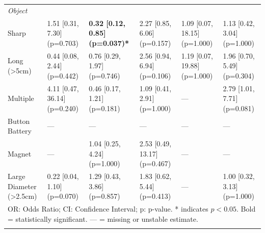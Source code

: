 \begin{table}
\begin{tabular}{p{3.5cm} p{4.1cm} p{4.1cm} p{4.1cm} p{4.1cm} p{4.1cm} }
\multicolumn{6}{l}{\textit{Object}} \\
\hspace{1em}Sharp & 1.51 [0.31, 7.30] (p=0.703) & \textbf{0.32 [0.12, 0.85] (p=0.037)*} & 2.27 [0.85, 6.06] (p=0.157) & 1.09 [0.07, 18.15] (p=1.000) & 1.13 [0.42, 3.04] (p=1.000) \\
\hspace{1em}Long (\textgreater 5cm) & 0.44 [0.08, 2.44] (p=0.442) & 0.76 [0.29, 1.97] (p=0.746) & 2.56 [0.94, 6.94] (p=0.106) & 1.19 [0.07, 19.88] (p=1.000) & 1.96 [0.70, 5.49] (p=0.304) \\
\hspace{1em}Multiple & 4.11 [0.47, 36.14] (p=0.240) & 0.46 [0.17, 1.21] (p=0.181) & 1.09 [0.41, 2.91] (p=1.000) & --- & 2.79 [1.01, 7.71] (p=0.081) \\
\hspace{1em}Button Battery & --- & --- & --- & --- & --- \\
\hspace{1em}Magnet & --- & 1.04 [0.25, 4.24] (p=1.000) & 2.53 [0.49, 13.17] (p=0.467) & --- & --- \\
\hspace{1em}Large Diameter (\textgreater 2.5cm) & 0.22 [0.04, 1.10] (p=0.070) & 1.29 [0.43, 3.86] (p=0.857) & 1.83 [0.62, 5.44] (p=0.413) & --- & 1.00 [0.32, 3.13] (p=1.000) \\
\multicolumn{6}{l}{\small OR: Odds Ratio; CI: Confidence Interval; p: p-value. * indicates $p < 0.05$. Bold = statistically significant. --- = missing or unstable estimate.} \\\\
\bottomrule
\end{tabular}
\end{table}
